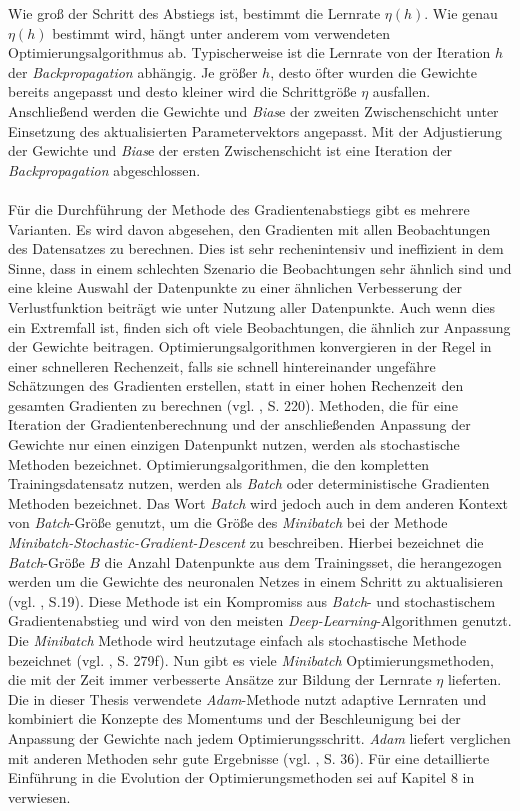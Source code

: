 \documentclass[a4paper,11pt]{article}
\begin{document}
Wie groß der Schritt des Abstiegs ist, bestimmt die Lernrate $\eta(h)$.
Wie genau $\eta(h)$ bestimmt wird, hängt unter anderem vom verwendeten Optimierungsalgorithmus ab. Typischerweise ist die Lernrate von der Iteration $h$ der \textit{Backpropagation} abhängig. Je größer $h$, desto öfter wurden die Gewichte bereits angepasst und desto kleiner wird die Schrittgröße $\eta$ ausfallen. 
Anschließend werden die Gewichte und \textit{Bias}e der zweiten Zwischenschicht unter Einsetzung des aktualisierten Parametervektors angepasst. Mit der Adjustierung der Gewichte und \textit{Bias}e der ersten Zwischenschicht ist eine Iteration der \textit{Backpropagation} abgeschlossen.\\
\\
Für die Durchführung der Methode des Gradientenabstiegs gibt es mehrere Varianten. Es wird davon abgesehen, den Gradienten mit allen Beobachtungen des Datensatzes zu berechnen. Dies ist sehr rechenintensiv und ineffizient in dem Sinne, dass in einem schlechten Szenario die Beobachtungen sehr ähnlich sind und eine kleine Auswahl der Datenpunkte zu einer ähnlichen Verbesserung der Verlustfunktion beiträgt wie unter Nutzung aller Datenpunkte. Auch wenn dies ein Extremfall ist, finden sich oft viele Beobachtungen, die ähnlich zur Anpassung der Gewichte beitragen. Optimierungsalgorithmen konvergieren in der Regel in einer schnelleren Rechenzeit, falls sie schnell hintereinander ungefähre Schätzungen des Gradienten erstellen, statt in einer hohen Rechenzeit den gesamten Gradienten zu berechnen (vgl. \cite{deepEssentials}, S. 220). Methoden, die für eine Iteration der Gradientenberechnung und der anschließenden Anpassung der Gewichte nur einen einzigen Datenpunkt nutzen, werden als stochastische Methoden bezeichnet. Optimierungsalgorithmen, die den kompletten Trainingsdatensatz nutzen, werden als \textit{Batch} oder deterministische Gradienten Methoden bezeichnet. Das Wort \textit{Batch} wird jedoch auch in dem anderen Kontext von \textit{Batch}-Größe genutzt, um die Größe des \textit{Minibatch} bei der Methode \textit{Minibatch-Stochastic-Gradient-Descent} zu beschreiben. Hierbei bezeichnet die \textit{Batch}-Größe $B$ die Anzahl Datenpunkte aus dem Trainingsset, die herangezogen werden um die Gewichte des neuronalen Netzes in einem Schritt zu aktualisieren (vgl. \cite{keras}, S.19). Diese Methode ist ein Kompromiss aus \textit{Batch}- und stochastischem Gradientenabstieg und wird von den meisten \textit{Deep-Learning}-Algorithmen genutzt. Die \textit{Minibatch} Methode wird heutzutage einfach als stochastische Methode bezeichnet (vgl. \cite{deepL}, S. 279f). Nun gibt es viele \textit{Minibatch} Optimierungsmethoden, die mit der Zeit immer verbesserte Ansätze zur Bildung der Lernrate $\eta$ lieferten. Die in dieser Thesis verwendete \textit{Adam}-Methode nutzt adaptive Lernraten und kombiniert die Konzepte des Momentums und der Beschleunigung bei der Anpassung der Gewichte nach jedem Optimierungsschritt. \textit{Adam} liefert verglichen mit anderen Methoden sehr gute Ergebnisse (vgl. \cite{keras}, S. 36). Für eine detaillierte Einführung in die Evolution der Optimierungsmethoden sei auf Kapitel 8 in \cite{deepL} verwiesen. \\
\end{document}
